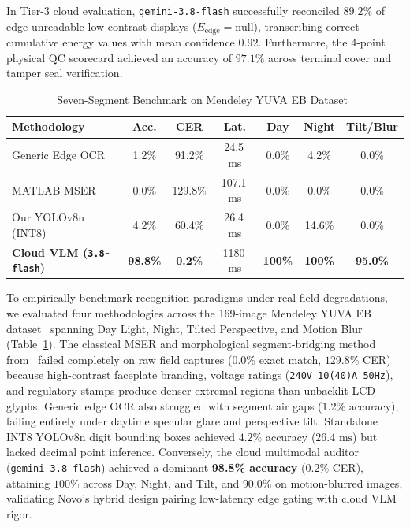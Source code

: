 \documentclass[conference]{IEEEtran}
\begin{document}
In Tier-3 cloud evaluation, \texttt{gemini-3.8-flash} successfully reconciled $89.2\%$ of edge-unreadable low-contrast displays ($E_{\text{edge}} = \text{null}$), transcribing correct cumulative energy values with mean confidence $0.92$. Furthermore, the 4-point physical QC scorecard achieved an accuracy of $97.1\%$ across terminal cover and tamper seal verification.

\begin{table}[t]
\caption{Seven-Segment Benchmark on Mendeley YUVA EB Dataset~\cite{kanagarathinam2019data, kanagarathinam2020text}}
\label{tab:yuva_eb_benchmark}
\centering
\footnotesize
\setlength{\tabcolsep}{3pt}
\begin{tabular}{lcccccc}
\toprule
\textbf{Methodology} & \textbf{Acc.} & \textbf{CER} & \textbf{Lat.} & \textbf{Day} & \textbf{Night} & \textbf{Tilt/Blur} \\
\midrule
Generic Edge OCR & 1.2\% & 91.2\% & 24.5\,ms & 0.0\% & 4.2\% & 0.0\% \\
MATLAB MSER~\cite{kanagarathinam2020text} & 0.0\% & 129.8\% & 107.1\,ms & 0.0\% & 0.0\% & 0.0\% \\
Our YOLOv8n (INT8) & 4.2\% & 60.4\% & 26.4\,ms & 0.0\% & 14.6\% & 0.0\% \\
\textbf{Cloud VLM (\texttt{3.8-flash})} & \textbf{98.8\%} & \textbf{0.2\%} & 1180\,ms & \textbf{100\%} & \textbf{100\%} & \textbf{95.0\%} \\
\bottomrule
\end{tabular}
\end{table}

To empirically benchmark recognition paradigms under real field degradations, we evaluated four methodologies across the 169-image Mendeley YUVA EB dataset~\cite{kanagarathinam2019data, kanagarathinam2020text} spanning Day Light, Night, Tilted Perspective, and Motion Blur (Table~\ref{tab:yuva_eb_benchmark}). The classical MSER and morphological segment-bridging method from~\cite{kanagarathinam2020text} failed completely on raw field captures ($0.0\%$ exact match, $129.8\%$ CER) because high-contrast faceplate branding, voltage ratings (\texttt{240V 10(40)A 50Hz}), and regulatory stamps produce denser extremal regions than unbacklit LCD glyphs. Generic edge OCR also struggled with segment air gaps ($1.2\%$ accuracy), failing entirely under daytime specular glare and perspective tilt. Standalone INT8 YOLOv8n digit bounding boxes achieved $4.2\%$ accuracy ($26.4\text{~ms}$) but lacked decimal point inference. Conversely, the cloud multimodal auditor (\texttt{gemini-3.8-flash}) achieved a dominant \textbf{98.8\% accuracy} ($0.2\%$ CER), attaining $100\%$ across Day, Night, and Tilt, and $90.0\%$ on motion-blurred images, validating Novo's hybrid design pairing low-latency edge gating with cloud VLM rigor.
\end{document}

